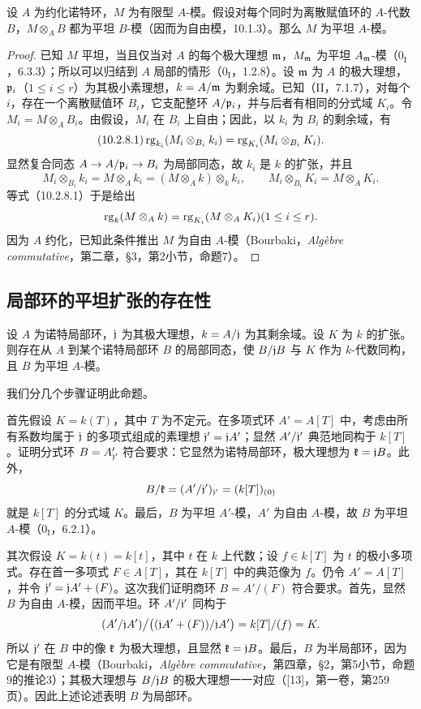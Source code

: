 设 $A$ 为约化诺特环，$M$ 为有限型 $A$-模。假设对每个同时为离散赋值环的 $A$-代数 $B$，$M\otimes_AB$ 都为平坦 $B$-模（因而为自由模，10.1.3）。那么 $M$ 为平坦 $A$-模。
\begin{proof}
已知 $M$ 平坦，当且仅当对 $A$ 的每个极大理想 $\mathfrak m$，$M_\mathfrak m$ 为平坦 $A_\mathfrak m$-模（$0_{\mathrm I}$，6.3.3）；所以可以归结到 $A$ 局部的情形（$0_{\mathrm I}$，1.2.8）。设 $\mathfrak m$ 为 $A$ 的极大理想，$\mathfrak p_i$（$1\leq i\leq r$）为其极小素理想，$k=A/\mathfrak m$ 为剩余域。已知（II，7.1.7），对每个 $i$，存在一个离散赋值环 $B_i$，它支配整环 $A/\mathfrak p_i$，并与后者有相同的分式域 $K_i$。令 $M_i=M\otimes_AB_i$。由假设，$M_i$ 在 $B_i$ 上自由；因此，以 $k_i$ 为 $B_i$ 的剩余域，有
\begin{equation}\tag{10.2.8.1}
\rk_{k_i}(M_i\otimes_{B_i}k_i)=\rk_{K_i}(M_i\otimes_{B_i}K_i).
\end{equation}
显然复合同态 $A\to A/\mathfrak p_i\to B_i$ 为局部同态，故 $k_i$ 是 $k$ 的扩张，并且
\[
M_i\otimes_{B_i}k_i=M\otimes_Ak_i=(M\otimes_Ak)\otimes_kk_i,
\qquad M_i\otimes_{B_i}K_i=M\otimes_AK_i.
\]
等式（10.2.8.1）于是给出
\[
\operatorname{rg}_k(M\otimes_Ak)=\operatorname{rg}_{K_i}(M\otimes_AK_i)(1\leq i\leq r).
\]
因为 $A$ 约化，已知此条件推出 $M$ 为自由 $A$-模（Bourbaki，\textit{Algèbre commutative}，第二章，§3，第2小节，命题7）。
\end{proof}

\subsection{局部环的平坦扩张的存在性}
设 $A$ 为诺特局部环，$\mathfrak j$ 为其极大理想，$k=A/\mathfrak j$ 为其剩余域。设 $K$ 为 $k$ 的扩张。则存在从 $A$ 到某个诺特局部环 $B$ 的局部同态，使 $B/\mathfrak j B$ 与 $K$ 作为 $k$-代数同构，且 $B$ 为平坦 $A$-模。

我们分几个步骤证明此命题。

首先假设 $K=k(T)$，其中 $T$ 为不定元。在多项式环 $A'=A[T]$ 中，考虑由所有系数均属于 $\mathfrak j$ 的多项式组成的素理想 $\mathfrak j'=\mathfrak j A'$；显然 $A'/\mathfrak j'$ 典范地同构于 $k[T]$。证明分式环 $B=A'_{\mathfrak j'}$ 符合要求：它显然为诺特局部环，极大理想为 $\mathfrak k=\mathfrak j B$。此外，
\[
B/\mathfrak k=(A'/\mathfrak j')_{\mathfrak j'}=(k[T])_{(0)}
\]
就是 $k[T]$ 的分式域 $K$。最后，$B$ 为平坦 $A'$-模，$A'$ 为自由 $A$-模，故 $B$ 为平坦 $A$-模（$0_{\mathrm I}$，6.2.1）。

其次假设 $K=k(t)=k[t]$，其中 $t$ 在 $k$ 上代数；设 $f\in k[T]$ 为 $t$ 的极小多项式。存在首一多项式 $F\in A[T]$，其在 $k[T]$ 中的典范像为 $f$。仍令 $A'=A[T]$，并令 $\mathfrak j'=\mathfrak j A'+(F)$。这次我们证明商环 $B=A'/(F)$ 符合要求。首先，显然 $B$ 为自由 $A$-模，因而平坦。环 $A'/\mathfrak j'$ 同构于
\[
(A'/\mathfrak j A')\big/\bigl((\mathfrak j A'+(F))/\mathfrak j A'\bigr)=k[T]/(f)=K.
\]
所以 $\mathfrak j'$ 在 $B$ 中的像 $\mathfrak k$ 为极大理想，且显然 $\mathfrak k=\mathfrak j B$。最后，$B$ 为半局部环，因为它是有限型 $A$-模（Bourbaki，\textit{Algèbre commutative}，第四章，§2，第5小节，命题9的推论3）；其极大理想与 $B/\mathfrak j B$ 的极大理想一一对应（[13]，第一卷，第259页）。因此上述论述表明 $B$ 为局部环。

